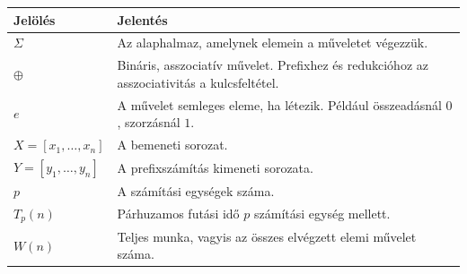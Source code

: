 \begin{tabularx}{\textwidth}{L{23mm}X}
\toprule
\textbf{Jelölés} & \textbf{Jelentés} \\
\midrule
$\Sigma$ & Az alaphalmaz, amelynek elemein a műveletet végezzük. \\
$\oplus$ & Bináris, asszociatív művelet. Prefixhez és redukcióhoz az asszociativitás a kulcsfeltétel. \\
$e$ & A művelet semleges eleme, ha létezik. Például összeadásnál $0$, szorzásnál $1$. \\
$X=[x_1,\ldots,x_n]$ & A bemeneti sorozat. \\
$Y=[y_1,\ldots,y_n]$ & A prefixszámítás kimeneti sorozata. \\
$p$ & A számítási egységek száma. \\
$T_p(n)$ & Párhuzamos futási idő $p$ számítási egység mellett. \\
$W(n)$ & Teljes munka, vagyis az összes elvégzett elemi művelet száma. \\
\bottomrule
\end{tabularx}
